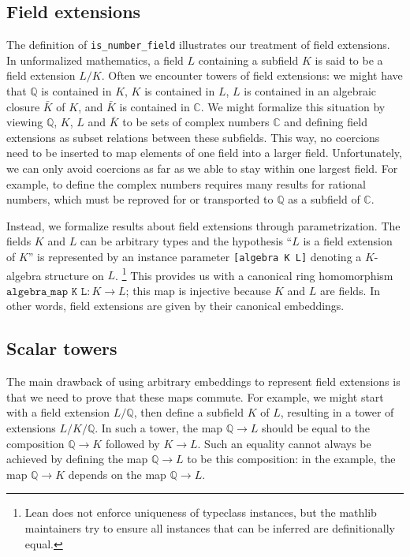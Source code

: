 \documentclass[a4paper,USenglish,cleveref, autoref, thm-restate]{lipics-v2021}
\newcommand{\C}{\mathbb{C}}
\newcommand{\lean}[1]{\texttt{#1}\xspace} %
\newcommand{\mathlib}{\textsf{mathlib}\xspace}
\newcommand{\Q}{\mathbb{Q}}
\begin{document}
\subsection{Field extensions}

The definition of \lean{is\_number\_field} illustrates our treatment of field extensions.
In unformalized mathematics, a field $L$ containing a subfield $K$ is said to be a field extension $L / K$.
Often we encounter towers of field extensions: we might have that $\Q$ is contained in $K$, $K$ is contained in $L$, $L$ is contained in an algebraic closure $\bar{K}$ of $K$, and $\bar{K}$ is contained in $\C$.
We might formalize this situation by viewing $\Q$, $K$, $L$ and $\bar{K}$ to be sets of complex numbers $\C$ and defining field extensions as subset relations between these subfields.
This way, no coercions need to be inserted to map elements of one field into a larger field.
Unfortunately, we can only avoid coercions as far as we able to stay within one largest field.
For example, to define the complex numbers requires many results for rational numbers, which must be reproved for or transported to $\Q$ as a subfield of $\C$.

Instead, we formalize results about field extensions through parametrization. The fields $K$ and $L$ can be arbitrary types
and the hypothesis ``$L$ is a field extension of $K$'' is represented by an instance parameter \lean{[algebra K L]} denoting a $K$-algebra structure on $L$.%
\footnote{Lean does not enforce uniqueness of typeclass instances, but the \mathlib maintainers try to ensure all instances that can be inferred are definitionally equal.}
This provides us with a canonical ring homomorphism $\lean{algebra\_map K L} : K \to L$; this map is injective because $K$ and $L$ are fields.
In other words, field extensions are given by their canonical embeddings.

\subsection{Scalar towers} \label{sec:scalar_tower}

The main drawback of using arbitrary embeddings to represent field extensions is that we need to prove that these maps commute.
For example, we might start with a field extension $L / \Q$, then define a subfield $K$ of $L$,
resulting in a tower of extensions $L / K / \Q$.
In such a tower, the map $\Q \to L$ should be equal to the composition $\Q \to K$ followed by $K \to L$.
Such an equality cannot always be achieved by defining the map $\Q \to L$ to be this composition: in the example, the map $\Q \to K$ depends on the map $\Q \to L$.
\end{document}
